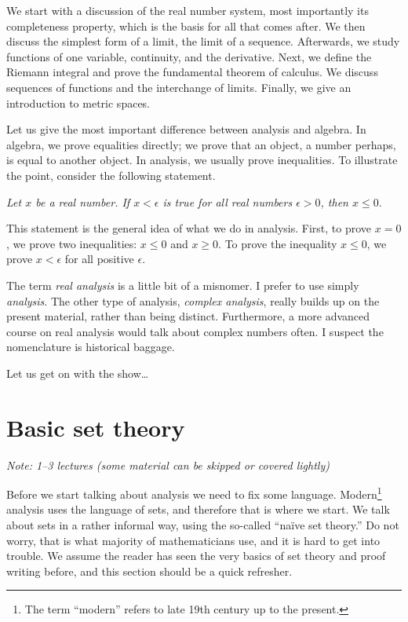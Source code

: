 \documentclass[12pt]{book}
\newcommand{\myindex}[1]{#1\index{#1}}
\newcommand{\sectionnotes}[1]{\noindent \emph{Note: #1} \medskip \par}
\newcommand{\sectionnewpage}{\clearpage}
\theoremstyle{plain}
\theoremstyle{remark}
\theoremstyle{definition}
\theoremstyle{exercise}
\theoremstyle{example}
\begin{document}
\medskip

We start with a discussion of the real number system, most importantly
its completeness property, which is the basis for all that comes after.
We then discuss the simplest form of a limit,
the limit of a sequence.  Afterwards, we study
functions of one variable, continuity, and the derivative.
Next, we define the Riemann integral and prove the fundamental theorem of
calculus.  We discuss sequences of functions and the
interchange of limits.  Finally, we give an introduction to metric
spaces.

Let us give the most important difference between analysis and
algebra.  In algebra, we prove equalities directly; we prove that
an object, a number perhaps, is equal to another object.  In analysis,
we usually prove inequalities.  To illustrate the point, consider the
following statement.

\medskip

\emph{Let $x$ be a real number.  If $x < \epsilon$ is true for all
real numbers
$\epsilon > 0$, then $x \leq 0$}.

\medskip

This statement is the general idea of what we do in analysis.  First, to
prove
$x = 0$, we prove two inequalities: $x \leq 0$ and $x \geq 0$.  To
prove the inequality
$x \leq 0$, we prove 
$x < \epsilon$ for all positive $\epsilon$.

\medskip

The term \emph{real analysis} is a little bit of a misnomer.  I prefer to
use simply \emph{analysis}.  The other type of analysis, 
\emph{complex analysis}, really builds up on the present material, rather than
being distinct.  Furthermore, a more advanced course on real
analysis would talk about complex numbers often.
I suspect the nomenclature is
historical baggage.

\medskip

Let us get on with the show\ldots



\sectionnewpage
\section{Basic set theory} \label{sec:basicset}

\sectionnotes{1--3 lectures (some material can be skipped or covered lightly)}

Before we start talking about analysis we need to fix some language.
Modern\footnote{The term ``modern'' refers to late 19th century up to
the present.}
analysis uses the language of sets, and therefore that is where we start.
We talk about sets in a rather informal way, using the so-called
``\myindex{na\"ive set theory}.''  Do not worry, that is what majority of
mathematicians use, and it is hard to get into trouble.
We assume the reader has seen the very basics of set theory
and proof writing before, and this section should be a quick refresher.
\end{document}
